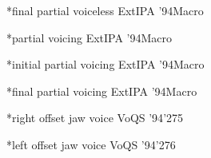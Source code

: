 %
  {*final partial voiceless}%
  {}{}{ExtIPA '94}{Macro}

%
  {*partial voicing}%
  {}{}{ExtIPA '94}{Macro}

%
  {*initial partial voicing}%
  {}{}{ExtIPA '94}{Macro}

%
  {*final partial voicing}%
  {}{}{ExtIPA '94}{Macro}

%
  {*right offset jaw voice}%
  {}{}{VoQS '94}{'275}

%
  {*left offset jaw voice}%
  {}{}{VoQS '94}{'276}

\endgroup %

\endgroup %

\endinput

